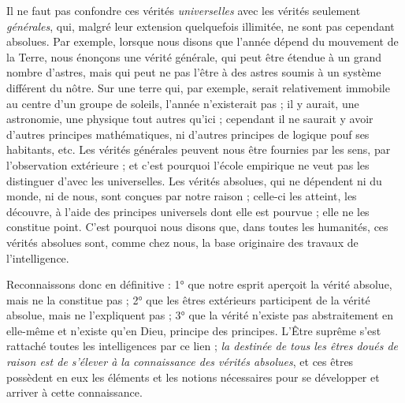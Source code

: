 \documentclass[a4paper, 11pt, oneside, landscape]{article}
\begin{document}
Il ne faut pas confondre ces vérités \emph{universelles} avec les vérités seulement \emph{générales}, qui, malgré leur extension quelquefois illimitée, ne sont pas cependant absolues. Par exemple, lorsque nous disons que l'année dépend du mouvement de la Terre, nous énonçons une vérité générale, qui peut être étendue à un grand nombre d'astres, mais qui peut ne pas l'être à des astres soumis à un système différent du nôtre. Sur une terre qui, par exemple, serait relativement immobile au centre d'un groupe de soleils, l'année n'existerait pas ; il y aurait, une astronomie, une physique tout autres qu'ici ; cependant il ne saurait y avoir d'autres principes mathématiques, ni d'autres principes de logique pouf ses habitants, etc. Les vérités générales peuvent nous être fournies par les sens, par l'observation extérieure ; et c'est pourquoi l'école empirique ne veut pas les distinguer d'avec les universelles. Les vérités absolues, qui ne dépendent ni du monde, ni de nous, sont conçues par notre raison ; celle-ci les atteint, les découvre, à l'aide des principes universels dont elle est pourvue ; elle ne les constitue point. C'est pourquoi nous disons que, dans toutes les humanités, ces vérités absolues sont, comme chez nous, la base originaire des travaux de l'intelligence.

Reconnaissons donc en définitive : 1° que notre esprit aperçoit la vérité absolue, mais ne la constitue pas ; 2° que les êtres extérieurs participent de la vérité absolue, mais ne l'expliquent pas ; 3° que la vérité n'existe pas abstraitement en elle-même et n'existe qu'en Dieu, principe des principes. L'Être suprême s'est rattaché toutes les intelligences par ce lien ; \emph{la destinée de tous les êtres doués de raison est de s'élever à la connaissance des vérités absolues}, et ces êtres possèdent en eux les éléments et les notions nécessaires pour se développer et arriver à cette connaissance.
\end{document}
